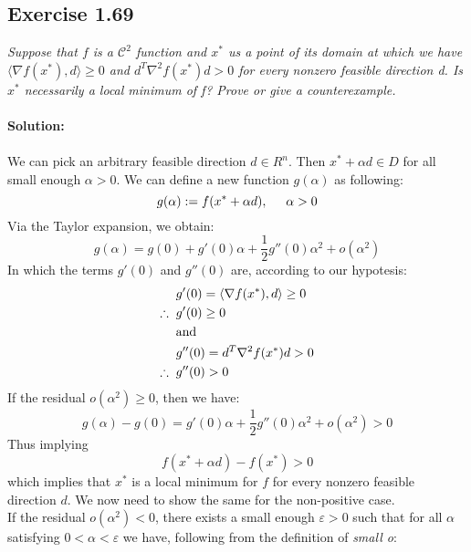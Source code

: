 \subsection{Exercise 1.69}
\emph{Suppose that $f$ is a $\mathcal{C}^2$ function and $x^*$ us a point of its domain at which we have $\langle\nabla f(x^*),d \rangle \geq 0$ and $d^T \nabla^2 f(x^*)d > 0$ for every nonzero feasible direction d. Is $x^*$ necessarily a local minimum of f? Prove or give a counterexample.} \\
\\
\textbf{Solution:}\\
\\
We can pick an arbitrary feasible direction $d \in R^n$. Then $ x^* + \alpha d \in D$ for all small enough $\alpha > 0$. We can define a new function $g(\alpha)$ as following:
\begin{equation}
    g(\alpha) := f(x^* + \alpha d), \hspace{0.5cm} \alpha > 0
\end{equation}
Via the Taylor expansion, we obtain:
\begin{equation}
    g(\alpha) = g(0) + g'(0)\alpha + \frac{1}{2} g''(0) \alpha^2 + o(\alpha^2)
\end{equation}
In which the terms $g'(0)$ and $g''(0)$ are, according to our hypotesis:
\begin{align}
    &g'(0) = \langle\nabla f(x^*),d \rangle \geq 0 \\
    \therefore \hspace{0.2cm} &g'(0) \geq 0 \\
    &\text{and} \\
    &g''(0) = d^T \nabla^2 f(x^*)d > 0\\
    \therefore \hspace{0.2cm} &g''(0) > 0
\end{align}
If the residual $o(\alpha ^2) \geq 0$, then we have:
\begin{equation}
    g(\alpha) - g(0) = g'(0)\alpha + \frac{1}{2} g''(0) \alpha^2 + o(\alpha^2) > 0
\end{equation}
Thus implying
\begin{equation}
    f(x^* + \alpha d) - f(x^*) > 0
\end{equation}
which implies that $x^*$ is a local minimum for $f$ for every nonzero feasible direction $d$. We now need to show the same for the non-positive case.\\
If the residual $o(\alpha ^2) < 0$, there exists a small enough $\varepsilon > 0$ such that for all $\alpha$ satisfying $0 < \alpha < \varepsilon$ we have, following from the definition of \emph{small o}:
